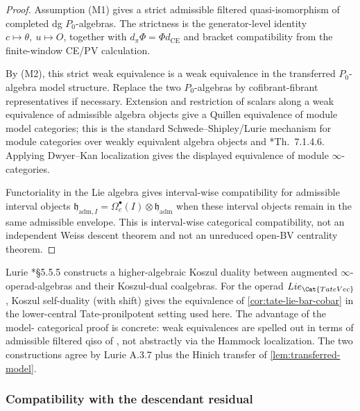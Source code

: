 \begin{proof}
  Assumption (M1) gives a strict admissible filtered quasi-isomorphism of
  completed dg \(P_0\)-algebras.  The strictness is the generator-level
  identity \(c\mapsto\theta,\ u\mapsto O\), together with
  \(d_\pi\Phi=\Phi d_{\mathrm{CE}}\) and bracket compatibility from the
  finite-window CE/PV calculation.

  By (M2), this strict weak equivalence is a weak equivalence in the
  transferred \(P_0\)-algebra model structure.  Replace the two
  \(P_0\)-algebras by cofibrant-fibrant representatives if necessary.
  Extension and restriction of scalars along a weak equivalence of
  admissible algebra objects give a Quillen equivalence of module model
  categories; this is the standard Schwede--Shipley/Lurie mechanism
  for module categories over weakly equivalent algebra objects
  \cite{schwede-shipley-monoid} and
  \cite{lurie-ha}*{Th.~7.1.4.6}.  Applying
  Dwyer--Kan localization gives the displayed equivalence of module
  \(\infty\)-categories.

  Functoriality in the Lie algebra gives interval-wise compatibility for
  admissible interval objects
  \(\mathfrak h_{\mathrm{adm},I}=
  \Omega^\bullet_c(I)\otimes\mathfrak h_{\mathrm{adm}}\) when these
  interval objects remain in the same admissible envelope.  This is
  interval-wise categorical compatibility, not an independent Weiss
  descent theorem and not an unreduced open-BV centrality theorem.
\end{proof}

\begin{rmk}
  \label{rmk:lurie-koszul}
  Lurie \cite{lurie-ha}*{\S 5.5.5} constructs a higher-algebraic
  Koszul duality between augmented $\infty$-operad-algebras and
  their Koszul-dual coalgebras. For the operad
  $\mathrm{Lie}_{\Cat{TateVec}}$, Koszul self-duality (with
  shift) gives the equivalence of \ref{cor:tate-lie-bar-cobar}
  in the lower-central Tate-pronilpotent setting used here. The advantage of the model-
  categorical proof is concrete: weak equivalences are spelled
  out in terms of admissible filtered qiso of \alpharef, not
  abstractly via the Hammock localization. The two constructions
  agree by Lurie A.3.7 plus the Hinich transfer of
  \ref{lem:transferred-model}.
\end{rmk}

\subsubsection{Compatibility with the descendant residual}


